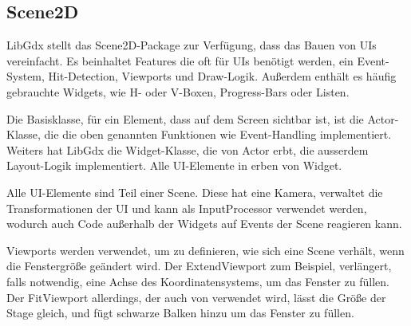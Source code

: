 
\subsection{Scene2D}\label{subsec:scene2D}

\renewcommand{\kapitelautor}{Autor: Marvin Kurka}

LibGdx stellt das Scene2D-Package zur Verfügung, dass das Bauen von UIs vereinfacht.
Es beinhaltet Features die oft für UIs benötigt werden, ein Event-System, Hit-Detection, Viewports und Draw-Logik.
Außerdem enthält es häufig gebrauchte Widgets, wie H- oder V-Boxen, Progress-Bars oder Listen.\cite{libGdxScene2DUi}

Die Basisklasse, für ein Element, dass auf dem Screen sichtbar ist, ist die Actor-Klasse, die die oben genannten
Funktionen wie Event-Handling implementiert.
Weiters hat LibGdx die Widget-Klasse, die von Actor erbt, die ausserdem Layout-Logik implementiert.
Alle UI-Elemente in \FF erben von Widget.\cite{libGdxScene2DUi}

Alle UI-Elemente sind Teil einer Scene.
Diese hat eine Kamera, verwaltet die Transformationen der UI und kann als InputProcessor verwendet werden, wodurch
auch Code außerhalb der Widgets auf Events der Scene reagieren kann.\cite{libGdxScene2D}

Viewports werden verwendet, um zu definieren, wie sich eine Scene verhält, wenn die Fenstergröße geändert wird.
Der ExtendViewport zum Beispiel, verlängert, falls notwendig, eine Achse des Koordinatensystems, um das Fenster zu füllen.
Der FitViewport allerdings, der auch von \FF verwendet wird, lässt die Größe der Stage gleich, und fügt schwarze Balken
hinzu um das Fenster zu füllen.\cite{libGdxViewports}


\renewcommand{\kapitelautor}{}
